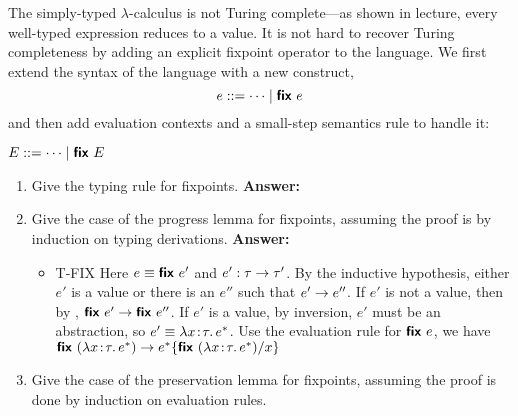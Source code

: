 \documentclass[11pt]{article}
\begin{document}
\begin{exercise}
The simply-typed $\lambda$-calculus is not Turing complete---as shown
in lecture, every well-typed expression reduces to a value. It is not
hard to recover Turing completeness by adding an explicit fixpoint
operator to the language. We first extend the syntax of the language
with a new construct,
\[
e ::= \dots \mid \textsf{\textbf{fix}}~e\\
\]
and then add evaluation contexts and a small-step semantics rule to
handle it:
\begin{center}
$E ::= \dots \mid \textsf{\textbf{fix}}~E$

\end{center}

\begin{enumerate}
\item Give the typing rule for fixpoints.
\newline
\newline
\textbf{Answer:}
\newline
\begin{center}
\end{center}
\item Give the case of the progress lemma for fixpoints, assuming the proof is by induction on typing derivations.
\newline
\newline
\textbf{Answer:}
	\begin{itemize}
		\item T-FIX \newline
		Here $e \equiv \typ{fix}\ e'$ and $e':\tau \rightarrow \tau'$. By the inductive hypothesis, either $e'$ is a value
		or there is an $e''$ such that $e' \rightarrow e''$.
		\newline
		If $e'$ is not a value, then by , $\textsf{\textbf{fix}}\ e' \rightarrow \textsf{\textbf{fix}}\ e''$. If $e'$ is a
		value, by inversion, $e'$ must be an abstraction, so $e' \equiv \lambda x\!:\!\tau.\,e^{\ast}$. 
		Use the evaluation rule for $\textsf{\textbf{fix}}\ e$, we have $\textsf{\textbf{fix}}~(\lambda x\!:\!\tau.\,e^{\ast}) \rightarrow
		 e^{\ast}\{\textsf{\textbf{fix}}~(\lambda x\!:\!\tau.\,e^{\ast}) / x\}$
	\end{itemize}
\item Give the case of the preservation lemma for fixpoints, assuming the proof is done by induction on evaluation rules.
\newline

\end{enumerate}
\end{exercise}
\end{document}
